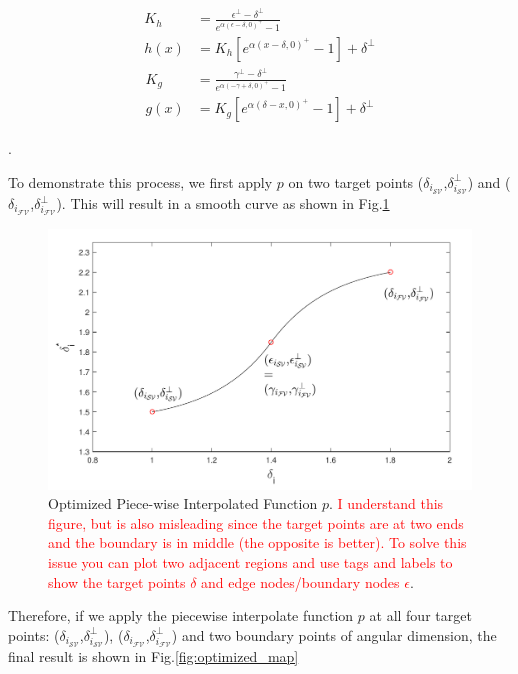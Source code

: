{\begin{align}
K_h &= \frac{\epsilon^{\perp}-\delta^{\perp}}{e^{\alpha(\epsilon-\delta,0)^{+}}-1}\\ \nonumber
h(x) &= K_h[e^{\alpha(x-\delta,0)^{+}}-1] + \delta^{\perp}
\end{align}
\begin{align}
K_g &= \frac{\gamma^{\perp}-\delta^{\perp}}{e^{\alpha(-\gamma+\delta,0)^{+}}-1}\\ \nonumber
g(x) &= K_g[e^{\alpha(\delta-x,0)^{+}}-1] + \delta^{\perp}
\end{align}

.

To demonstrate this process, we first apply $p$ on two target points ($\delta_{i_{{\mathcal{SV}}}}$,$\delta^{\perp}_{i_{{\mathcal{SV}}}}$) and ($\delta_{i_{{\mathcal{FV}}}}$,$\delta^{\perp}_{i_{{\mathcal{FV}}}}$). This will result in a smooth curve as shown in Fig.\ref{fig:optimized_p}

\begin{figure}[t]
\centering
\includegraphics[scale=.7]{Fig/optimized_single_f.pdf}
\caption{Optimized Piece-wise Interpolated Function $p$. \textcolor{red}{I understand this figure, but is also misleading since the target points are at two ends and the boundary is in middle (the opposite is better). To solve this issue you can plot two adjacent regions and use tags and labels to show the target points $\delta$ and edge nodes/boundary nodes $\epsilon$}.}
\label{fig:optimized_p}
\end{figure}

Therefore, if we apply the piecewise interpolate function $p$ at all four target points: ($\delta_{i_{{\mathcal{SV}}}}$,$\delta^{\perp}_{i_{{\mathcal{SV}}}}$), ($\delta_{i_{{\mathcal{FV}}}}$,$\delta^{\perp}_{i_{{\mathcal{FV}}}}$) and two boundary points of angular dimension, the final result is shown in Fig.\ref{fig:optimized_map}

}
